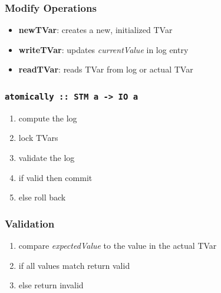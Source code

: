 \documentclass{beamer}
\begin{document}
  \begin{frame}
   \frametitle{Modify Operations}
   \begin{itemize}\setlength\itemsep{1em}
    \item \textbf{newTVar}: creates a new, initialized TVar 
    \item \textbf{writeTVar}: updates \textit{currentValue} in log entry
    \item \textbf{readTVar}: reads TVar from log or actual TVar
  \end{itemize}
\end{frame}
  
%   
  \begin{frame}
   \frametitle{\lstinline{atomically :: STM a -> IO a}}
   \begin{enumerate}\setlength\itemsep{1em}
    \item compute the log
    \item lock TVars
    \item validate the log
    \item if valid then commit
    \item else roll back
   \end{enumerate}
  \end{frame}

  \begin{frame}
   \frametitle{Validation}
    \begin{enumerate}\setlength\itemsep{1em}
      \item compare \textit{expectedValue} to the value in the actual TVar
      \item if all values match return valid 
      \item else return invalid
    \end{enumerate}
  \end{frame}
\end{document}
